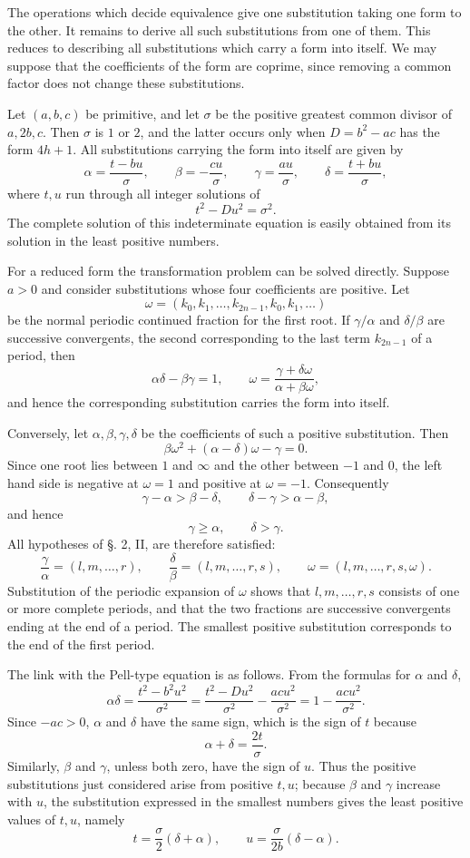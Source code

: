 \documentclass[11pt]{article}
\begin{document}
The operations which decide equivalence give one substitution taking one form to the other. It remains to derive all such substitutions from one of them. This reduces to describing all substitutions which carry a form into itself. We may suppose that the coefficients of the form are coprime, since removing a common factor does not change these substitutions.

Let $(a,b,c)$ be primitive, and let $\sigma$ be the positive greatest common divisor of $a,2b,c$. Then $\sigma$ is $1$ or $2$, and the latter occurs only when $D=b^2-ac$ has the form $4h+1$. All substitutions carrying the form into itself are given by
\[
 \alpha=\frac{t-bu}{\sigma},
 \qquad
 \beta=-\frac{cu}{\sigma},
 \qquad
 \gamma=\frac{au}{\sigma},
 \qquad
 \delta=\frac{t+bu}{\sigma},
\]
where $t,u$ run through all integer solutions of
\[
 t^2-Du^2=\sigma^2.
\]
The complete solution of this indeterminate equation is easily obtained from its solution in the least positive numbers.

For a reduced form the transformation problem can be solved directly. Suppose $a>0$ and consider substitutions whose four coefficients are positive. Let
\[
 \omega=(k_0,k_1,\ldots,k_{2n-1},k_0,k_1,\ldots)
\]
be the normal periodic continued fraction for the first root. If $\gamma/\alpha$ and $\delta/\beta$ are successive convergents, the second corresponding to the last term $k_{2n-1}$ of a period, then
\[
 \alpha\delta-\beta\gamma=1,
 \qquad
 \omega=\frac{\gamma+\delta\omega}{\alpha+\beta\omega},
\]
and hence the corresponding substitution carries the form into itself.

Conversely, let $\alpha,\beta,\gamma,\delta$ be the coefficients of such a positive substitution. Then
\[
 \beta\omega^2+(\alpha-
\delta)\omega-
\gamma=0.
\]
Since one root lies between $1$ and $\infty$ and the other between $-1$ and $0$, the left hand side is negative at $\omega=1$ and positive at $\omega=-1$. Consequently
\[
 \gamma-
\alpha>\beta-
\delta,
 \qquad
 \delta-
\gamma>\alpha-
\beta,
\]
and hence
\[
 \gamma\geq\alpha,
 \qquad
 \delta>\gamma.
\]
All hypotheses of \S. 2, II, are therefore satisfied:
\[
 \frac{\gamma}{\alpha}=(l,m,\ldots,r),
 \qquad
 \frac{\delta}{\beta}=(l,m,\ldots,r,s),
 \qquad
 \omega=(l,m,\ldots,r,s,
\omega).
\]
Substitution of the periodic expansion of $\omega$ shows that $l,m,\ldots,r,s$ consists of one or more complete periods, and that the two fractions are successive convergents ending at the end of a period. The smallest positive substitution corresponds to the end of the first period.

The link with the Pell-type equation is as follows. From the formulas for $\alpha$ and $\delta$,
\[
 \alpha\delta=\frac{t^2-b^2u^2}{\sigma^2}
 =\frac{t^2-Du^2}{\sigma^2}-\frac{ac u^2}{\sigma^2}
 =1-
\frac{ac u^2}{\sigma^2}.
\]
Since $-ac>0$, $\alpha$ and $\delta$ have the same sign, which is the sign of $t$ because
\[
 \alpha+
\delta=\frac{2t}{\sigma}.
\]
Similarly, $\beta$ and $\gamma$, unless both zero, have the sign of $u$. Thus the positive substitutions just considered arise from positive $t,u$; because $\beta$ and $\gamma$ increase with $u$, the substitution expressed in the smallest numbers gives the least positive values of $t,u$, namely
\[
 t=\frac{\sigma}{2}(\delta+
\alpha),
 \qquad
 u=\frac{\sigma}{2b}(\delta-
\alpha).
\]
\end{document}
